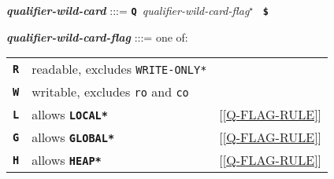 \documentclass[12pt]{article}
\newcommand{\TT}[1]{{\tt \bfseries #1}}
\newcommand{\STAR}{{\Large $^\star$}}
\newcommand{\ttkey}[1]{{\tt \bfseries #1}}
\newcommand{\emkey}[1]{{\em \bfseries #1}}
\newenvironment{indpar}[1][0.3in]%
	{\begin{list}{}%
		     {\setlength{\itemsep}{0in}%
		      \setlength{\topsep}{0in}%
		      \setlength{\parsep}{1ex}%
		      \setlength{\labelwidth}{#1}%
		      \setlength{\leftmargin}{#1}%
		      \addtolength{\leftmargin}{\labelsep}}%
	 \item}%
	{\end{list}}
\begin{document}
\begin{indpar}
\emkey{qualifier-wild-card}\label{QUALIFIER-WILD-CARD} :::=
    \TT{Q}~{\em qualifier-wild-card-flag}\STAR{}~ \TT{\$}

\emkey{qualifier-wild-card-flag}\label{QUALIFIER-WILD-FLAG} :::= one of: \\
\hspace*{0.2in}\begin{tabular}{rll}
\ttkey{R} & readable, excludes {\tt *WRITE-ONLY*} \\
\ttkey{W} & writable, excludes {\tt ro} and {\tt co} \\
\ttkey{L} & allows \TT{*LOCAL*}  & [\ref{Q-FLAG-RULE}] \\
\ttkey{G} & allows \TT{*GLOBAL*} & [\ref{Q-FLAG-RULE}] \\
\ttkey{H} & allows \TT{*HEAP*}   & [\ref{Q-FLAG-RULE}] \\
\end{tabular}
\end{indpar}
\end{document}
